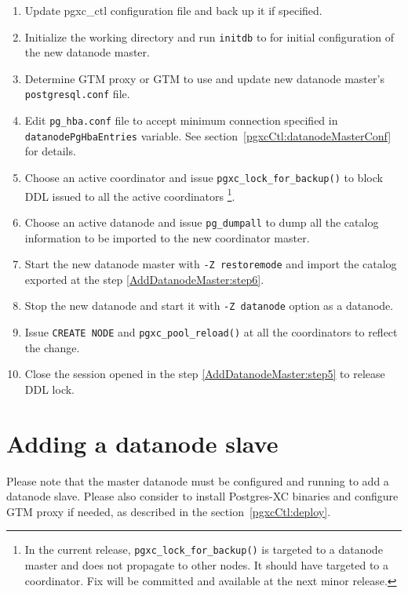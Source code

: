   \begin{enumerate}
	  \item Update pgxc\_ctl configuration file and back up it if specified.
	  \item Initialize the working directory and run \verb|initdb| to for initial configuration
	  		of the new datanode master.
	  \item Determine GTM proxy or GTM to use and update new datanode master's
	  		\verb|postgresql.conf| file.
	  \item Edit \verb|pg_hba.conf| file to accept minimum connection specified in
	  		\verb|datanodePgHbaEntries| variable.
			See section~\ref{pgxcCtl:datanodeMasterConf} for details.
	  \item \label{AddDatanodeMaster:step5}Choose an active coordinator and issue
	  		\verb|pgxc_lock_for_backup()| to block DDL issued to all the active coordinators
			\footnote{
				In the current release, {\tt pgxc\_lock\_for\_backup()} is targeted to a datanode
				master and does not propagate to other nodes.
				It should have targeted to a coordinator.
				Fix will be committed and available at the next minor release.
			}.
	  \item \label{AddDatanodeMaster:step6}Choose an active datanode and issue \verb|pg_dumpall|
	  		to dump all the catalog information to be imported to the new coordinator master.
	  \item Start the new datanode master with \verb|-Z restoremode| and import the catalog
	  		exported at the step \ref{AddDatanodeMaster:step6}.
	  \item Stop the new datanode and start it with \verb|-Z datanode| option as a datanode.
	  \item Issue \verb|CREATE NODE| and \verb|pgxc_pool_reload()| at all the coordinators to
	  		reflect the change.
	  \item Close the session opened in the step \ref{AddDatanodeMaster:step5} to release DDL lock.
  \end{enumerate}




\section{Adding a datanode slave}

  Please note that the master datanode must be configured and running to add a datanode slave.
  Please also consider to install Postgres-XC binaries and configure GTM proxy if needed,
  as described in the section~\ref{pgxcCtl:deploy}.
  
